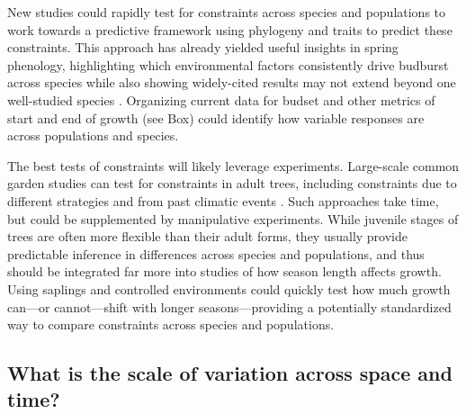 \documentclass[11pt]{article}
\newcommand{\R}[1]{\label{#1}\linelabel{#1}}
\begin{document}
New studies could rapidly test for constraints across species and populations to work towards a predictive framework using phylogeny and traits to predict these constraints. This approach has already yielded useful insights in spring phenology, highlighting which environmental factors consistently drive budburst across species while also showing widely-cited results may not extend beyond one well-studied species \citep{morales2024phylogenetic}. Organizing current data for budset and other metrics of start and end of growth (see Box) could identify how variable responses are across populations and species. 

\R{moconstrainS}The best tests of constraints will likely leverage experiments. Large-scale common garden studies can test for constraints in adult trees, including constraints due to different strategies and from past climatic events \citep[e.g., by selecting species with different growth strategies and/or selecting populations within a species with varying past exposure to damaging early season frosts][]{charrier2015effects,tixier2020comparison}. Such approaches take time, but could be supplemented by manipulative experiments. While juvenile stages of trees are often more flexible than their adult forms, they usually provide predictable inference in differences across species and populations, and thus should be integrated far more into studies of how season length affects growth. Using saplings and controlled environments could quickly test how much growth can---or cannot---shift with longer seasons---providing a potentially standardized way to compare constraints across species and populations.\R{moconstrainE} 


\subsection*{What is the scale of variation across space and time?} %
\end{document}
